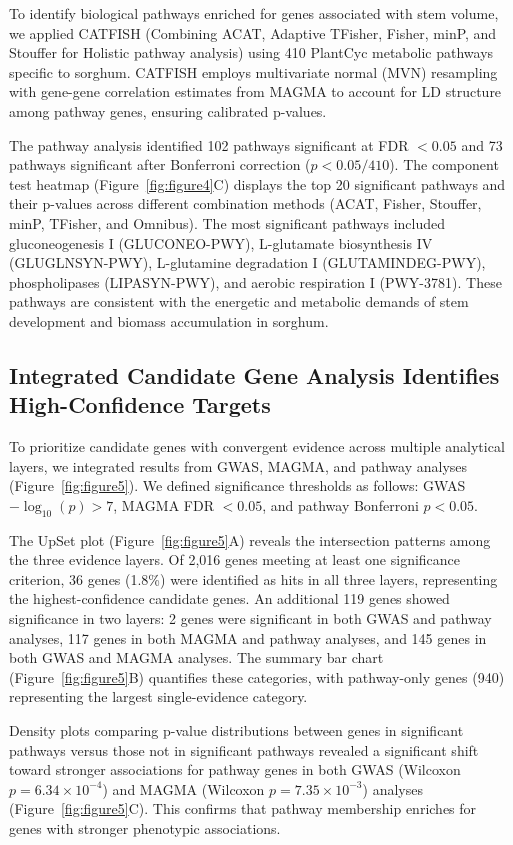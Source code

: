\documentclass[11pt]{article}
\begin{document}
To identify biological pathways enriched for genes associated with stem volume, we applied CATFISH (Combining ACAT, Adaptive TFisher, Fisher, minP, and Stouffer for Holistic pathway analysis) using 410 PlantCyc metabolic pathways specific to sorghum. CATFISH employs multivariate normal (MVN) resampling with gene-gene correlation estimates from MAGMA to account for LD structure among pathway genes, ensuring calibrated p-values.

The pathway analysis identified 102 pathways significant at FDR $< 0.05$ and 73 pathways significant after Bonferroni correction ($p < 0.05/410$). The component test heatmap (Figure~\ref{fig:figure4}C) displays the top 20 significant pathways and their p-values across different combination methods (ACAT, Fisher, Stouffer, minP, TFisher, and Omnibus). The most significant pathways included gluconeogenesis I (GLUCONEO-PWY), L-glutamate biosynthesis IV (GLUGLNSYN-PWY), L-glutamine degradation I (GLUTAMINDEG-PWY), phospholipases (LIPASYN-PWY), and aerobic respiration I (PWY-3781). These pathways are consistent with the energetic and metabolic demands of stem development and biomass accumulation in sorghum.

\subsection{Integrated Candidate Gene Analysis Identifies High-Confidence Targets}

To prioritize candidate genes with convergent evidence across multiple analytical layers, we integrated results from GWAS, MAGMA, and pathway analyses (Figure~\ref{fig:figure5}). We defined significance thresholds as follows: GWAS $-\log_{10}(p) > 7$, MAGMA FDR $< 0.05$, and pathway Bonferroni $p < 0.05$.

The UpSet plot (Figure~\ref{fig:figure5}A) reveals the intersection patterns among the three evidence layers. Of 2,016 genes meeting at least one significance criterion, 36 genes (1.8\%) were identified as hits in all three layers, representing the highest-confidence candidate genes. An additional 119 genes showed significance in two layers: 2 genes were significant in both GWAS and pathway analyses, 117 genes in both MAGMA and pathway analyses, and 145 genes in both GWAS and MAGMA analyses. The summary bar chart (Figure~\ref{fig:figure5}B) quantifies these categories, with pathway-only genes (940) representing the largest single-evidence category.

Density plots comparing p-value distributions between genes in significant pathways versus those not in significant pathways revealed a significant shift toward stronger associations for pathway genes in both GWAS (Wilcoxon $p = 6.34 \times 10^{-4}$) and MAGMA (Wilcoxon $p = 7.35 \times 10^{-3}$) analyses (Figure~\ref{fig:figure5}C). This confirms that pathway membership enriches for genes with stronger phenotypic associations.
\end{document}
